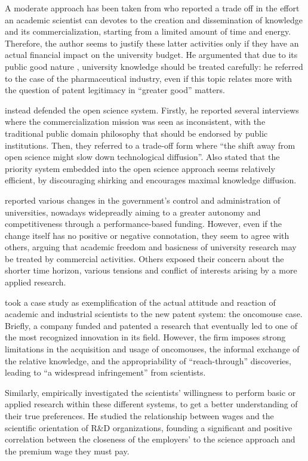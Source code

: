 A moderate approach has been taken from \citet{Beath2000} who reported a trade off in the effort an academic scientist can devotes to the creation and dissemination of knowledge and its commercialization, starting from a limited amount of time and energy. Therefore, the author seems to justify these latter activities only if they have an actual financial impact on the university budget. He argumented that due to its public good nature \citep{Muscio2013}, university knowledge should be treated carefully: he referred to the case of the pharmaceutical industry, even if this topic relates more with the question of patent legitimacy in \enquote{greater good} matters.

\citet{Siegel2003a} instead defended the open science system. Firstly, he reported several interviews where the commercialization mission was seen as inconsistent, with the traditional public domain philosophy that should be endorsed by public institutions. Then, they referred to a trade-off form \citet{Nelson2001} where \enquote{the shift away from open science might slow down technological diffusion}. Also \citet{Stern2004} stated that the priority system embedded into the open science approach seems relatively efficient, by discouraging shirking and encourages maximal knowledge diffusion.

\citet{Rasmussen2006} reported various changes in the government's control and administration of universities, nowadays widepreadly aiming to a greater autonomy and competitiveness through a performance-based funding. However, even if the change itself has no positive or negative connotation, they seem to agree with others, arguing that academic freedom and basicness of university research may be treated by commercial activities. Others exposed their concern about the shorter time horizon, various tensions and conflict of interests arising by a more applied research. 

\citet{Murray2005} took a case study as exemplification of the actual attitude and reaction of academic and industrial scientists to the new patent system: the oncomouse case. Briefly, a company funded and patented a research that eventually led to one of the most recognized innovation in its field. However, the firm imposes strong limitations in the acquisition and usage of oncomouses, the informal exchange of the relative knowledge, and the appropriability of \enquote{reach-through} discoveries, leading to \enquote{a widespread infringement} from scientists. 

Similarly, \citet{Stern2004} empirically investigated the scientists' willingness to perform basic or applied research within these different systems, to get a better understanding of their true preferences. He studied the relationship between wages and the scientific orientation of R\&D organizations, founding a significant and positive correlation between the closeness of the employers' to the science approach and the premium wage they must pay.

